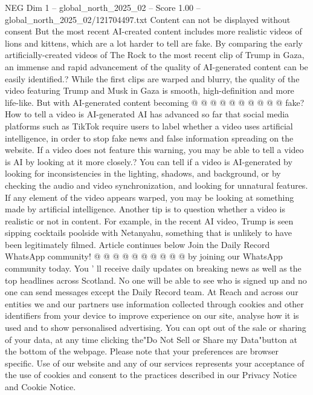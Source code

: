 \begin{textsample}{NEG Dim 1 – global\_north\_2025\_02 – Score 1.00 – global\_north\_2025\_02/121704497.txt}
Content can not be displayed without consent But the most recent AI-created content includes more realistic videos of lions and kittens, which are a lot harder to tell are fake.
By comparing the early artificially-created videos of The Rock to the most recent clip of Trump in Gaza, an immense and rapid advancement of the quality of AI-generated content can be easily identified.?
While the first clips are warped and blurry, the quality of the video featuring Trump and Musk in Gaza is smooth, high-definition and more life-like.
But with AI-generated content becoming @ @ @ @ @ @ @ @ @ @ fake?
How to tell a video is AI-generated AI has advanced so far that social media platforms such as TikTok require users to label whether a video uses artificial intelligence, in order to stop fake news and false information spreading on the website.
If a video does not feature this warning, you may be able to tell a video is AI by looking at it more closely.?
You can tell if a video is AI-generated by looking for inconsistencies in the lighting, shadows, and background, or by checking the audio and video synchronization, and looking for unnatural features.
If any element of the video appears warped, you may be looking at something made by artificial intelligence.
Another tip is to question whether a video is realistic or not in content.
For example, in the recent AI video, Trump is seen sipping cocktails poolside with Netanyahu, something that is unlikely to have been legitimately filmed.
Article continues below Join the Daily Record WhatsApp community! @ @ @ @ @ @ @ @ @ @ by joining our WhatsApp community today.
You ' ll receive daily updates on breaking news as well as the top headlines across Scotland.
No one will be able to see who is signed up and no one can send messages except the Daily Record team.
At Reach and across our entities we and our partners use information collected through cookies and other identifiers from your device to improve experience on our site, analyse how it is used and to show personalised advertising.
You can opt out of the sale or sharing of your data, at any time clicking the"Do Not Sell or Share my Data"button at the bottom of the webpage.
Please note that your preferences are browser specific.
Use of our website and any of our services represents your acceptance of the use of cookies and consent to the practices described in our Privacy Notice and Cookie Notice.

\end{textsample}
